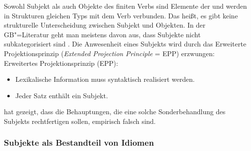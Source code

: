 % 
Sowohl Subjekt als auch Objekte des finiten Verbs sind Elemente der \compsl und werden in Strukturen
gleichen Typs mit dem Verb verbunden.
Das heißt, es gibt keine strukturelle Unterscheidung zwischen Subjekt und 
Objekten. In der GB"=Literatur geht man meistens
davon aus, dass Subjekte nicht subkategorisiert sind \parencites[siehe z.\,B.][--28]{Chomsky93a}[]{Hoekstra87a}.
Die Anwesenheit eines Subjekts wird durch das Erweiterte Projektionsprinzip (\emph{Extended Projection
Principle} = EPP) erzwungen:
\ea
Erweitertes Projektionsprinzip (EPP):
\begin{itemize}
\item Lexikalische Information muss syntaktisch realisiert werden.
\item Jeder Satz enthält ein Subjekt. 
\end{itemize}
\z

\noindent
\citet[Abschnitt~2]{Bresnan82c} hat gezeigt, dass die Behauptungen,
die eine solche Sonderbehandlung des Subjekts rechtfertigen sollen, empirisch falsch sind.


\subsubsection{Subjekte als Bestandteil von Idiomen}



